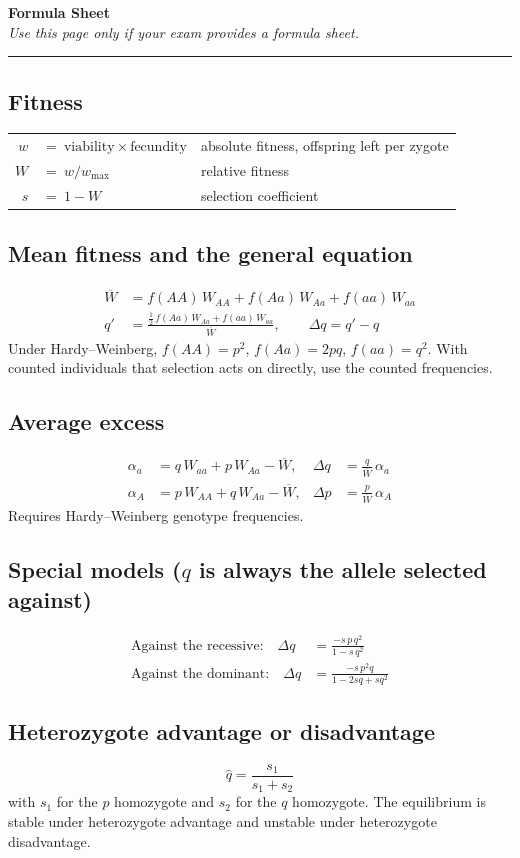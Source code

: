 \documentclass[11pt]{article}
\begin{document}
\newpage
\begin{center}
  {\Large\bfseries Formula Sheet}\\[3pt]
  {\small\itshape Use this page only if your exam provides a formula sheet.}\\[2pt]
  \rule{\textwidth}{0.4pt}
\end{center}

\subsection*{Fitness}
\begin{center}\renewcommand{\arraystretch}{2.1}
\begin{tabular}{r@{\;}l@{\qquad}l}
  \(w\) & \(=\ \text{viability} \times \text{fecundity}\) & absolute fitness, offspring left per zygote\\
  \(W\) & \(=\ w / w_{\max}\) & relative fitness\\
  \(s\) & \(=\ 1 - W\) & selection coefficient
\end{tabular}\end{center}

\subsection*{Mean fitness and the general equation}
\begin{align*}
  \overline{W} &= f(AA)\,W_{AA} + f(Aa)\,W_{Aa} + f(aa)\,W_{aa}\\[4pt]
  q' &= \frac{\tfrac{1}{2}\,f(Aa)\,W_{Aa} + f(aa)\,W_{aa}}{\overline{W}}, \qquad \Delta q = q' - q
\end{align*}
Under Hardy--Weinberg, \(f(AA)=p^2\), \(f(Aa)=2pq\), \(f(aa)=q^2\). With counted individuals that selection acts on directly, use the counted frequencies.

\subsection*{Average excess}
\begin{align*}
  \alpha_a &= q\,W_{aa} + p\,W_{Aa} - \overline{W}, & \Delta q &= \frac{q}{\overline{W}}\,\alpha_a\\[4pt]
  \alpha_A &= p\,W_{AA} + q\,W_{Aa} - \overline{W}, & \Delta p &= \frac{p}{\overline{W}}\,\alpha_A
\end{align*}
Requires Hardy--Weinberg genotype frequencies.

\subsection*{Special models (\(q\) is always the allele selected against)}
\begin{align*}
  \text{Against the recessive:}\quad \Delta q &= \frac{-s\,p\,q^2}{1 - s\,q^2}\\[4pt]
  \text{Against the dominant:}\quad \Delta q &= \frac{-s\,p^2 q}{1 - 2sq + sq^2}
\end{align*}

\subsection*{Heterozygote advantage or disadvantage}
\[
  \hat{q} = \frac{s_1}{s_1 + s_2}
\]
with \(s_1\) for the \(p\) homozygote and \(s_2\) for the \(q\) homozygote. The equilibrium is stable under heterozygote advantage and unstable under heterozygote disadvantage.

\label{LastPage}
\end{document}
